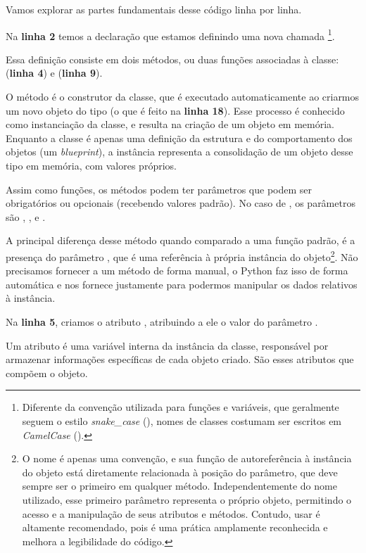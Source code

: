 Vamos explorar as partes fundamentais desse código linha por linha.

Na \textbf{linha 2} temos a declaração que estamos definindo uma nova 
chamada \footnote{Diferente da convenção utilizada para funções e variáveis, que geralmente seguem o
estilo \textit{snake\_case} (), nomes de classes costumam ser escritos em \textit{CamelCase} ().}.

Essa definição consiste em dois métodos, ou duas funções associadas à classe:  (\textbf{linha 4}) e
 (\textbf{linha 9}).

O método  é o construtor da classe, que é executado automaticamente ao criarmos um novo objeto do
tipo  (o que é feito na \textbf{linha 18}).
Esse processo é conhecido como instanciação da classe, e resulta na criação de um objeto em memória.
Enquanto a classe é apenas uma definição da estrutura e do comportamento dos objetos (um \emph{blueprint}), a instância
representa a consolidação de um objeto desse tipo em memória, com valores próprios.


Assim como funções, os métodos podem ter parâmetros que podem ser obrigatórios ou opcionais (recebendo
valores padrão).
No caso de , os parâmetros são , ,  e .

A principal diferença desse método quando comparado a uma função padrão, é a presença do parâmetro
, que é uma referência à própria instância do objeto\footnote{O nome  é apenas uma convenção, e sua função de autoreferência à instância do objeto está
diretamente relacionada à posição do parâmetro, que deve sempre ser o primeiro em qualquer método.
Independentemente do nome utilizado, esse primeiro parâmetro representa o próprio objeto, permitindo o acesso e a
manipulação de seus atributos e métodos. Contudo, usar  é altamente recomendado, pois é uma prática amplamente
reconhecida e melhora a legibilidade do código.}.
Não precisamos fornecer  a um método de forma manual, o
Python faz isso de forma automática e nos fornece  justamente para podermos manipular os dados relativos à instância.

Na \textbf{linha 5}, criamos o atributo , atribuindo a ele o valor do parâmetro .

Um atributo é uma variável interna da instância da classe, responsável por armazenar informações específicas de cada
objeto criado.
São esses atributos que compõem o objeto.

